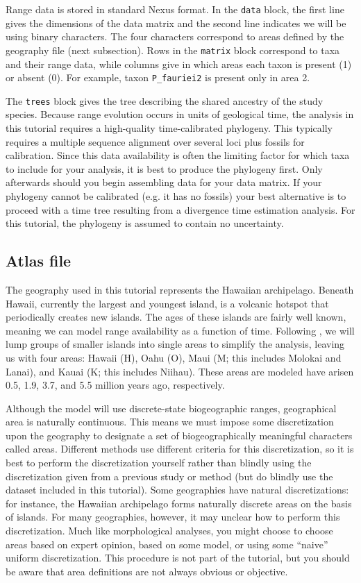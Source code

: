 \documentclass[11pt]{article}
\begin{document}
Range data is stored in standard Nexus format.
In the {\tt data} block, the first line gives the dimensions of the data matrix and the second line indicates we will be using binary characters.
The four characters correspond to areas defined by the geography file (next subsection).
Rows in the {\tt matrix} block correspond to taxa and their range data, while columns give in which areas each taxon is present (1) or absent (0).
For example, taxon {\tt P\_fauriei2} is present only in area 2.

The {\tt trees} block gives the tree describing the shared ancestry of the study species.
Because range evolution occurs in units of geological time, the analysis in this tutorial requires a high-quality time-calibrated phylogeny.
This typically requires a multiple sequence alignment over several loci plus fossils for calibration.
Since this data availability is often the limiting factor for which taxa to include for your analysis, it is best to produce the phylogeny first.
Only afterwards should you begin assembling data for your data matrix.
If your phylogeny cannot be calibrated (e.g. it has no fossils) your best alternative is to proceed with a time tree resulting from a divergence time estimation analysis.
For this tutorial, the phylogeny is assumed to contain no uncertainty.

\subsection{Atlas file}

The geography used in this tutorial represents the Hawaiian archipelago.
Beneath Hawaii, currently the largest and youngest island, is a volcanic hotspot that periodically creates new islands.
The ages of these islands are fairly well known, meaning we can model range availability as a function of time.
Following \citet{ree08}, we will lump groups of smaller islands into single areas to simplify the analysis, leaving us with four areas: Hawaii (H), Oahu (O), Maui (M; this includes Molokai and Lanai), and Kauai (K; this includes Niihau).
These areas are modeled have arisen 0.5, 1.9, 3.7, and 5.5 million years ago, respectively.

Although the model will use discrete-state biogeographic ranges, geographical area is naturally continuous.
This means we must impose some discretization upon the geography to designate a set of biogeographically meaningful characters called areas.
Different methods use different criteria for this discretization, so it is best to perform the discretization yourself rather than blindly using the discretization given from a previous study or method (but do blindly use the dataset included in this tutorial).
Some geographies have natural discretizations: for instance, the Hawaiian archipelago forms naturally discrete areas on the basis of islands.
For many geographies, however, it may unclear how to perform this discretization.
Much like morphological analyses, you might choose to choose areas based on expert opinion, based on some model, or using some ``naive'' uniform discretization.
This procedure is not part of the tutorial, but you should be aware that area definitions are not always obvious or objective.
\end{document}
